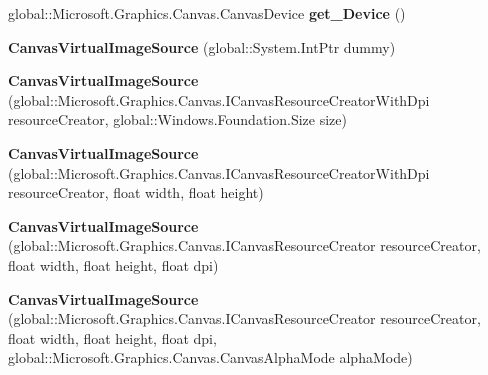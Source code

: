 \begin{DoxyCompactItemize}
global\+::\+Microsoft.\+Graphics.\+Canvas.\+Canvas\+Device {\bfseries get\+\_\+\+Device} ()
\item 
\mbox{\label{class_microsoft_1_1_graphics_1_1_canvas_1_1_u_i_1_1_xaml_1_1_canvas_virtual_image_source_a514d9c30fbd43794543c3c86f1f45471}} 
{\bfseries Canvas\+Virtual\+Image\+Source} (global\+::\+System.\+Int\+Ptr dummy)
\item 
\mbox{\label{class_microsoft_1_1_graphics_1_1_canvas_1_1_u_i_1_1_xaml_1_1_canvas_virtual_image_source_aebcca3188e39dcafae53146219d289c9}} 
{\bfseries Canvas\+Virtual\+Image\+Source} (global\+::\+Microsoft.\+Graphics.\+Canvas.\+I\+Canvas\+Resource\+Creator\+With\+Dpi resource\+Creator, global\+::\+Windows.\+Foundation.\+Size size)
\item 
\mbox{\label{class_microsoft_1_1_graphics_1_1_canvas_1_1_u_i_1_1_xaml_1_1_canvas_virtual_image_source_a8b810e5a0a07f77ef3ac71a77e4bb2b9}} 
{\bfseries Canvas\+Virtual\+Image\+Source} (global\+::\+Microsoft.\+Graphics.\+Canvas.\+I\+Canvas\+Resource\+Creator\+With\+Dpi resource\+Creator, float width, float height)
\item 
\mbox{\label{class_microsoft_1_1_graphics_1_1_canvas_1_1_u_i_1_1_xaml_1_1_canvas_virtual_image_source_ae338bb104e07429d6161b64bada335db}} 
{\bfseries Canvas\+Virtual\+Image\+Source} (global\+::\+Microsoft.\+Graphics.\+Canvas.\+I\+Canvas\+Resource\+Creator resource\+Creator, float width, float height, float dpi)
\item 
\mbox{\label{class_microsoft_1_1_graphics_1_1_canvas_1_1_u_i_1_1_xaml_1_1_canvas_virtual_image_source_a8b703980e00fce9ea6161cf83fea05af}} 
{\bfseries Canvas\+Virtual\+Image\+Source} (global\+::\+Microsoft.\+Graphics.\+Canvas.\+I\+Canvas\+Resource\+Creator resource\+Creator, float width, float height, float dpi, global\+::\+Microsoft.\+Graphics.\+Canvas.\+Canvas\+Alpha\+Mode alpha\+Mode)
\item 

\end{DoxyCompactItemize}
